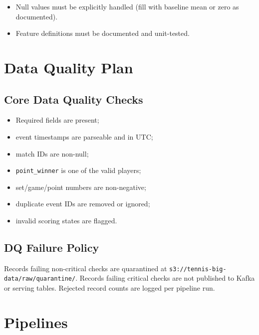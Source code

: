 \documentclass[11pt,a4paper]{article}
\begin{document}
\begin{itemize}[nosep]
  \item Null values must be explicitly handled (fill with baseline mean or zero as documented).
  \item Feature definitions must be documented and unit-tested.
\end{itemize}

\section{Data Quality Plan}

\subsection{Core Data Quality Checks}

\begin{itemize}[nosep]
  \item Required fields are present;
  \item event timestamps are parseable and in UTC;
  \item match IDs are non-null;
  \item \texttt{point\_winner} is one of the valid players;
  \item set/game/point numbers are non-negative;
  \item duplicate event IDs are removed or ignored;
  \item invalid scoring states are flagged.
\end{itemize}

\subsection{DQ Failure Policy}

Records failing non-critical checks are quarantined at
\texttt{s3://tennis-big-data/raw/quarantine/}. Records failing critical checks are not published
to Kafka or serving tables. Rejected record counts are logged per pipeline run.

\section{Pipelines}
\end{document}
